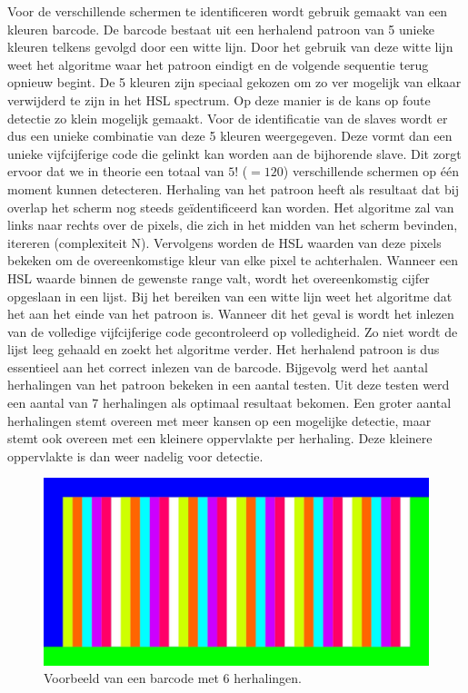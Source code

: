 \documentclass[a4paper,11pt]{article}
\begin{document}
Voor de verschillende schermen te identificeren wordt gebruik gemaakt van een kleuren barcode. De barcode bestaat uit een herhalend patroon van 5 unieke kleuren telkens gevolgd door een witte lijn. Door het gebruik van deze witte lijn weet het algoritme waar het patroon eindigt en de volgende sequentie terug opnieuw begint. De 5 kleuren zijn speciaal gekozen om zo ver mogelijk van elkaar verwijderd te zijn in het HSL spectrum. Op deze manier is de kans op foute detectie zo klein mogelijk gemaakt. Voor de identificatie van de slaves wordt er dus een unieke combinatie van deze 5 kleuren weergegeven. Deze vormt dan een unieke vijfcijferige code die gelinkt kan worden aan de bijhorende slave. Dit zorgt ervoor dat we in theorie een totaal van $5!$ ($=120$) verschillende schermen op één moment kunnen detecteren. Herhaling van het patroon heeft als resultaat dat bij overlap het scherm nog steeds geïdentificeerd kan worden. Het algoritme zal van links naar rechts over de pixels, die zich in het midden van het scherm bevinden, itereren (complexiteit N). Vervolgens worden de HSL waarden van deze pixels bekeken om de overeenkomstige kleur van elke pixel te achterhalen. Wanneer een HSL waarde binnen de gewenste range valt, wordt het overeenkomstig cijfer opgeslaan in een lijst. Bij het bereiken van een witte lijn weet het algoritme dat het aan het einde van het patroon is. Wanneer dit het geval is wordt het inlezen van de volledige vijfcijferige code gecontroleerd op volledigheid. Zo niet wordt de lijst leeg gehaald en zoekt het algoritme verder. Het herhalend patroon is dus essentieel aan het correct inlezen van de barcode. Bijgevolg werd het aantal herhalingen van het patroon bekeken in een aantal testen. Uit deze testen werd een aantal van 7 herhalingen als optimaal resultaat bekomen. Een groter aantal herhalingen stemt overeen met meer kansen op een mogelijke detectie, maar stemt ook overeen met een kleinere oppervlakte per herhaling. Deze kleinere oppervlakte is dan weer nadelig voor detectie. 

\begin{figure}[h]
\centering
\includegraphics[scale=0.1]{barcode}
\caption{Voorbeeld van een barcode met 6 herhalingen.} 
\label{fig:barcode}
\end{figure}
\end{document}
